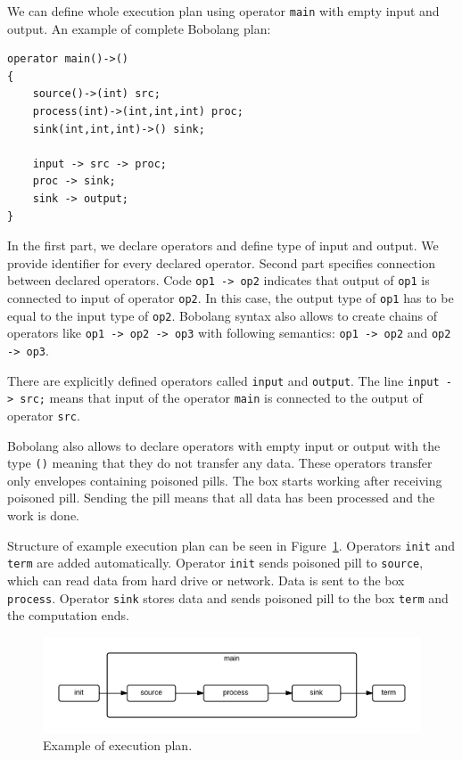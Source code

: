 We can define whole execution plan using operator \verb|main| with empty input and output. An example of complete Bobolang plan:

\begin{verbatim}
operator main()->()
{
    source()->(int) src;
    process(int)->(int,int,int) proc;
    sink(int,int,int)->() sink;

    input -> src -> proc; 
    proc -> sink;
    sink -> output;
}
\end{verbatim}

In the first part, we declare operators and define type of input and output. We provide identifier for every declared operator. Second part specifies connection between declared operators. Code \verb|op1 -> op2| indicates that output of \verb|op1| is connected to input of operator \verb|op2|. In this case, the output type of \verb|op1| has to be equal to the input type of \verb|op2|. Bobolang syntax also allows to create chains of operators like \verb|op1 -> op2 -> op3| with following semantics: \verb|op1 -> op2| and \verb|op2 -> op3|. 

There are explicitly defined operators called \verb|input| and \verb|output|. The line \verb|input -> src;| means that input of the operator \verb|main| is connected to the output of operator \verb|src|.

Bobolang also allows to declare operators with empty input or output with the type \verb|()| meaning that they do not transfer any data. These operators transfer only envelopes containing poisoned pills. The box starts working after receiving poisoned pill. Sending the pill means that all data has been processed and the work is done.


 Structure of example execution plan can be seen in Figure~\ref{fig:exampleplan}. Operators \verb|init| and \verb|term| are added automatically. Operator \verb|init| sends poisoned pill to \verb|source|, which can read data from hard drive or network. Data is sent to the box \verb|process|. Operator \verb|sink| stores data and sends poisoned pill to the box \verb|term| and the computation ends.
\begin{figure}[h!]
  \centering

    \includegraphics[width=1\textwidth]{exampleplan}
    
      \caption{Example of execution plan.}
        \label{fig:exampleplan}
\end{figure}




